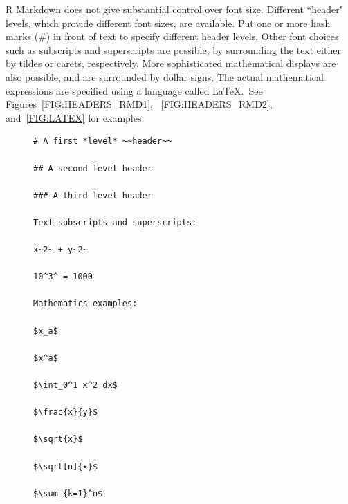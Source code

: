 \documentclass[12pt,oneside]{book}\usepackage[]{graphicx}\usepackage[]{color}
\begin{document}
R Markdown does not give substantial control over font size. Different ``header" levels, which provide different font sizes, are available. Put one or more hash marks (\#) in front of text to specify different header levels. Other font choices such as subscripts and superscripts are possible, by surrounding the text either by tildes or carets, respectively. More sophisticated mathematical displays are also possible, and are surrounded by dollar signs. The actual mathematical expressions are specified using a language called \LaTeX.\  See Figures~\ref{FIG:HEADERS_RMD1}, ~\ref{FIG:HEADERS_RMD2}, and~\ref{FIG:LATEX} for examples. 

\begin{figure}[!ht]
\centering
\begin{minipage}{0.45\textwidth}
\centering
\begin{verbatim}
# A first *level* ~~header~~

## A second level header

### A third level header

Text subscripts and superscripts:

x~2~ + y~2~

10^3^ = 1000

Mathematics examples:

$x_a$

$x^a$

$\int_0^1 x^2 dx$

$\frac{x}{y}$

$\sqrt{x}$

$\sqrt[n]{x}$

$\sum_{k=1}^n$


\end{verbatim}
\end{minipage}
\end{figure}
\end{document}
